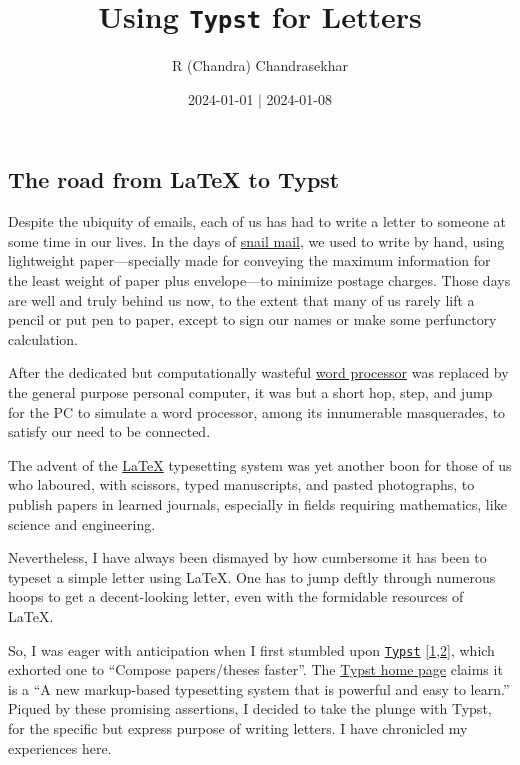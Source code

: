 \documentclass[
  a4paper,
]{article}
\title{Using \texttt{Typst} for Letters}
\author{R (Chandra) Chandrasekhar}
\date{2024-01-01 | 2024-01-08}
\begin{document}
\maketitle

\thispagestyle{empty}


\hypertarget{the-road-from-latex-to-typst}{%
\subsection{The road from LaTeX to
Typst}\label{the-road-from-latex-to-typst}}

Despite the ubiquity of emails, each of us has had to write a letter to
someone at some time in our lives. In the days of
\href{https://www.merriam-webster.com/dictionary/snail\%20mail}{snail
mail}, we used to write by hand, using lightweight paper---specially
made for conveying the maximum information for the least weight of paper
plus envelope---to minimize postage charges. Those days are well and
truly behind us now, to the extent that many of us rarely lift a pencil
or put pen to paper, except to sign our names or make some perfunctory
calculation.

After the dedicated but computationally wasteful
\href{https://www.webopedia.com/definitions/word-processor/}{word
processor} was replaced by the general purpose personal computer, it was
but a short hop, step, and jump for the PC to simulate a word processor,
among its innumerable masquerades, to satisfy our need to be connected.

The advent of the \href{https://www.latex-project.org/}{LaTeX}
typesetting system was yet another boon for those of us who laboured,
with scissors, typed manuscripts, and pasted photographs, to publish
papers in learned journals, especially in fields requiring mathematics,
like science and engineering.

Nevertheless, I have always been dismayed by how cumbersome it has been
to typeset a simple letter using LaTeX. One has to jump deftly through
numerous hoops to get a decent-looking letter, even with the formidable
resources of LaTeX.

So, I was eager with anticipation when I first stumbled upon
\href{https://typst.app/}{\texttt{Typst}}
{[}\protect\hyperlink{ref-typst01}{1},\protect\hyperlink{ref-typst02}{2}{]},
which exhorted one to ``Compose papers/theses faster''. The
\href{https://github.com/typst/typst}{Typst home page} claims it is a
``A new markup-based typesetting system that is powerful and easy to
learn.'' Piqued by these promising assertions, I decided to take the
plunge with Typst, for the specific but express purpose of writing
letters. I have chronicled my experiences here.
\end{document}
